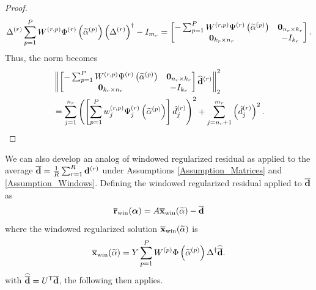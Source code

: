 \documentclass[12pt]{article}
\begin{document}
\begin{proof}
\[\Delta^{(r)}\sum_{p=1}^{P} W^{(r,p)}\Phi^{(r)}\left(\widetilde{\alpha}^{(p)}\right){\left(\Delta^{(r)}\right)}^\dagger - I_{m_r} = \begin{bmatrix}
-\sum_{p=1}^{P} W^{(r,p)} \Psi^{(r)}\left(\widetilde{\alpha}^{(p)}\right) & \bm{0}_{n_r \times k_r} \\
\bm{0}_{k_r \times n_r} & -I_{k_r}
\end{bmatrix}.\]
Thus, the norm becomes
\begin{align*}
    &\left\|\begin{bmatrix}
-\sum_{p=1}^{P} W^{(r,p)} \Psi^{(r)}\left(\widetilde{\alpha}^{(p)}\right) & \bm{0}_{n_r \times k_r} \\
\bm{0}_{k_r \times n_r} & -I_{k_r}
\end{bmatrix}\widehat{\mathbf{d}}^{(r)}\right\|_2^2 \\
&= \sum_{j=1}^{n_r} \left(\left[\sum_{p=1}^{P} w_{j}^{(r,p)}\Psi_{j}^{(r)}\left(\widetilde{\alpha}^{(p)}\right)\right] \hat{d}_j^{(r)}\right)^2 + \sum_{j ={n_r}+1}^{m_r} \left(\hat{d}_j^{(r)}\right)^2.
\end{align*}
\end{proof}

We can also develop an analog of windowed regularized residual as applied to the average $\overline{\mathbf{d}} = \frac{1}{R}\sum_{r=1}^R \mathbf{d}^{(r)}$ under Assumptions \ref{Assumption_Matrices} and \ref{Assumption_Windows}. Defining the windowed regularized residual applied to $\overline{\mathbf{d}}$ as
\begin{equation}
\label{eq:Average residual}
\overline{\mathbf{r}}_{\text{win}}(\bm{\alpha}) = A\overline{\mathbf{x}}_{\text{win}}(\widetilde{\alpha}) - \overline{\mathbf{d}}
\end{equation}
where the windowed regularized solution $\overline{\mathbf{x}}_{\text{win}}(\widetilde{\alpha})$ is
\begin{equation}
\label{eq:Windowed Averaged Regularized Solution}
\overline{\mathbf{x}}_{\text{win}}(\widetilde{\alpha}) = Y\sum_{p=1}^{P} W^{(p)}\Phi\left(\widetilde{\alpha}^{(p)}\right){\Delta}^\dagger\widehat{\overline{\mathbf{d}}}.
\end{equation}
with $\widehat{\overline{\mathbf{d}}} = {U}^\mathsf{T}\overline{\mathbf{d}}$, the following then applies.
\end{document}
